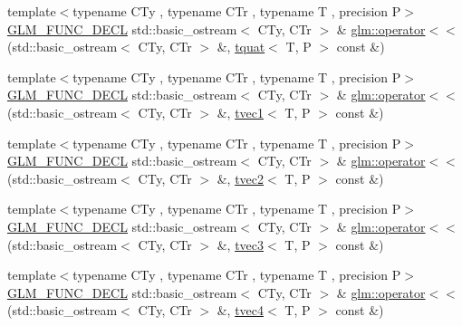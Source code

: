 \begin{DoxyCompactItemize}
\item 
{\footnotesize template$<$typename C\+Ty , typename C\+Tr , typename T , precision P$>$ }\\\mbox{\hyperlink{setup_8hpp_ab2d052de21a70539923e9bcbf6e83a51}{G\+L\+M\+\_\+\+F\+U\+N\+C\+\_\+\+D\+E\+CL}} std\+::basic\+\_\+ostream$<$ C\+Ty, C\+Tr $>$ \& \mbox{\hyperlink{group__gtx__io_ga038d37e8d7965dc7bfae5dc23e4140af}{glm\+::operator$<$$<$}} (std\+::basic\+\_\+ostream$<$ C\+Ty, C\+Tr $>$ \&, \mbox{\hyperlink{structglm_1_1tquat}{tquat}}$<$ T, P $>$ const \&)
\item 
{\footnotesize template$<$typename C\+Ty , typename C\+Tr , typename T , precision P$>$ }\\\mbox{\hyperlink{setup_8hpp_ab2d052de21a70539923e9bcbf6e83a51}{G\+L\+M\+\_\+\+F\+U\+N\+C\+\_\+\+D\+E\+CL}} std\+::basic\+\_\+ostream$<$ C\+Ty, C\+Tr $>$ \& \mbox{\hyperlink{group__gtx__io_ga171289d1671b75e033a1b078c68a7460}{glm\+::operator$<$$<$}} (std\+::basic\+\_\+ostream$<$ C\+Ty, C\+Tr $>$ \&, \mbox{\hyperlink{structglm_1_1tvec1}{tvec1}}$<$ T, P $>$ const \&)
\item 
{\footnotesize template$<$typename C\+Ty , typename C\+Tr , typename T , precision P$>$ }\\\mbox{\hyperlink{setup_8hpp_ab2d052de21a70539923e9bcbf6e83a51}{G\+L\+M\+\_\+\+F\+U\+N\+C\+\_\+\+D\+E\+CL}} std\+::basic\+\_\+ostream$<$ C\+Ty, C\+Tr $>$ \& \mbox{\hyperlink{group__gtx__io_ga0a3bca262adbba991f394d8d3d52e10d}{glm\+::operator$<$$<$}} (std\+::basic\+\_\+ostream$<$ C\+Ty, C\+Tr $>$ \&, \mbox{\hyperlink{structglm_1_1tvec2}{tvec2}}$<$ T, P $>$ const \&)
\item 
{\footnotesize template$<$typename C\+Ty , typename C\+Tr , typename T , precision P$>$ }\\\mbox{\hyperlink{setup_8hpp_ab2d052de21a70539923e9bcbf6e83a51}{G\+L\+M\+\_\+\+F\+U\+N\+C\+\_\+\+D\+E\+CL}} std\+::basic\+\_\+ostream$<$ C\+Ty, C\+Tr $>$ \& \mbox{\hyperlink{group__gtx__io_ga0d6cfb5d138639b90f18d7bbb2a4ae56}{glm\+::operator$<$$<$}} (std\+::basic\+\_\+ostream$<$ C\+Ty, C\+Tr $>$ \&, \mbox{\hyperlink{structglm_1_1tvec3}{tvec3}}$<$ T, P $>$ const \&)
\item 
{\footnotesize template$<$typename C\+Ty , typename C\+Tr , typename T , precision P$>$ }\\\mbox{\hyperlink{setup_8hpp_ab2d052de21a70539923e9bcbf6e83a51}{G\+L\+M\+\_\+\+F\+U\+N\+C\+\_\+\+D\+E\+CL}} std\+::basic\+\_\+ostream$<$ C\+Ty, C\+Tr $>$ \& \mbox{\hyperlink{group__gtx__io_ga948ab426a879f24236d8978ee9b5fade}{glm\+::operator$<$$<$}} (std\+::basic\+\_\+ostream$<$ C\+Ty, C\+Tr $>$ \&, \mbox{\hyperlink{structglm_1_1tvec4}{tvec4}}$<$ T, P $>$ const \&)

\end{DoxyCompactItemize}
